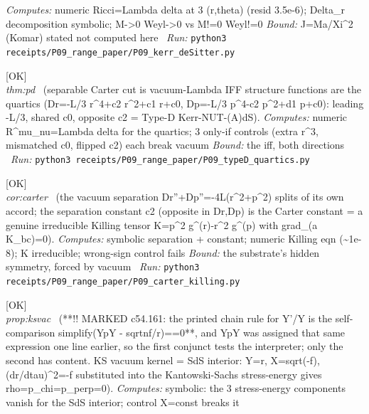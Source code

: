 \begin{description}
\emph{Computes:} numeric Ricci=Lambda delta at 3 (r,theta) (resid 3.5e-6); Delta\_r decomposition symbolic; M->0 Weyl->0 vs M!=0 Weyl!=0
 \emph{Bound:} J=Ma/Xi\textasciicircum{}2 (Komar) stated not computed here
\ \emph{Run:} \texttt{python3 receipts/P09\_range\_paper/P09\_kerr\_deSitter.py}
\item[\rcptlabel{P09_typeD_quartics}{P9R4}\textbf{P9R4}\quad\texttt{P09\_typeD\_quartics}]\hfill\textsf{[OK]}\\
\textit{thm:pd} \ (separable Carter cut is vacuum-Lambda IFF structure functions are the quartics (Dr=-L/3 r\textasciicircum{}4+c2 r\textasciicircum{}2+c1 r+c0, Dp=-L/3 p\textasciicircum{}4-c2 p\textasciicircum{}2+d1 p+c0): leading -L/3, shared c0, opposite c2 = Type-D Kerr-NUT-(A)dS). 
\emph{Computes:} numeric R\textasciicircum{}mu\_nu=Lambda delta for the quartics; 3 only-if controls (extra r\textasciicircum{}3, mismatched c0, flipped c2) each break vacuum
 \emph{Bound:} the iff, both directions
\ \emph{Run:} \texttt{python3 receipts/P09\_range\_paper/P09\_typeD\_quartics.py}
\item[\rcptlabel{P09_carter_killing}{P9R5}\textbf{P9R5}\quad\texttt{P09\_carter\_killing}]\hfill\textsf{[OK]}\\
\textit{cor:carter} \ (the vacuum separation Dr''+Dp''=-4L(r\textasciicircum{}2+p\textasciicircum{}2) splits of its own accord; the separation constant c2 (opposite in Dr,Dp) is the Carter constant = a genuine irreducible Killing tensor K=p\textasciicircum{}2 g\textasciicircum{}(r)-r\textasciicircum{}2 g\textasciicircum{}(p) with grad\_(a K\_bc)=0). 
\emph{Computes:} symbolic separation + constant; numeric Killing eqn (\textasciitilde{}1e-8); K irreducible; wrong-sign control fails
 \emph{Bound:} the substrate's hidden symmetry, forced by vacuum
\ \emph{Run:} \texttt{python3 receipts/P09\_range\_paper/P09\_carter\_killing.py}
\item[\rcptlabel{P09_ks_vacuum}{P9R6}\textbf{P9R6}\quad\texttt{P09\_ks\_vacuum}]\hfill\textsf{[OK]}\\
\textit{prop:ksvac} \ (**!! MARKED c54.161: the printed chain rule for Y'/Y is the self-comparison simplify(YpY - sqrtnf/r)==0**, and YpY was assigned that same expression one line earlier, so the first conjunct tests the interpreter; only the second has content. KS vacuum kernel = SdS interior: Y=r, X=sqrt(-f), (dr/dtau)\textasciicircum{}2=-f substituted into the Kantowski-Sachs stress-energy gives rho=p\_chi=p\_perp=0). 
\emph{Computes:} symbolic: the 3 stress-energy components vanish for the SdS interior; control X=const breaks it

\end{description}
